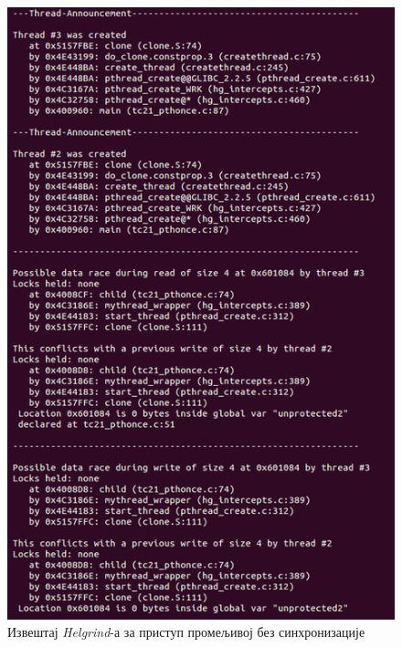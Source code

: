 \documentclass[12pt,oneside]{memoir}
\begin{document}
\begin{figure}[h!]
\begin{center}
\includegraphics[scale=0.75]{slika17.png}
\end{center}
\caption{Извештај \textit{Helgrind}-а за приступ промељивој без синхронизације}
\label{fig:helgrind}
\end{figure}
\end{document}
